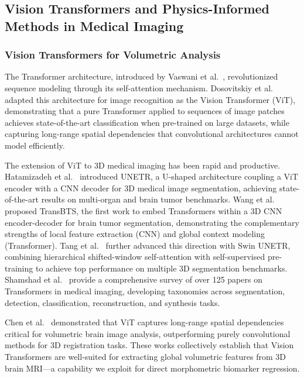 \subsection{Vision Transformers and Physics-Informed Methods in Medical Imaging}

\subsubsection{Vision Transformers for Volumetric Analysis}

The Transformer architecture, introduced by Vaswani et al.~\cite{vaswani2017attention}, revolutionized sequence modeling through its self-attention mechanism. Dosovitskiy et al.~\cite{dosovitskiy2021vit} adapted this architecture for image recognition as the Vision Transformer (ViT), demonstrating that a pure Transformer applied to sequences of image patches achieves state-of-the-art classification when pre-trained on large datasets, while capturing long-range spatial dependencies that convolutional architectures cannot model efficiently.

The extension of ViT to 3D medical imaging has been rapid and productive. Hatamizadeh et al.~\cite{hatamizadeh2022unetr} introduced UNETR, a U-shaped architecture coupling a ViT encoder with a CNN decoder for 3D medical image segmentation, achieving state-of-the-art results on multi-organ and brain tumor benchmarks. Wang et al.~\cite{wang2021transbts} proposed TransBTS, the first work to embed Transformers within a 3D CNN encoder-decoder for brain tumor segmentation, demonstrating the complementary strengths of local feature extraction (CNN) and global context modeling (Transformer). Tang et al.~\cite{tang2022swinunetr} further advanced this direction with Swin UNETR, combining hierarchical shifted-window self-attention with self-supervised pre-training to achieve top performance on multiple 3D segmentation benchmarks. Shamshad et al.~\cite{shamshad2023survey} provide a comprehensive survey of over 125 papers on Transformers in medical imaging, developing taxonomies across segmentation, detection, classification, reconstruction, and synthesis tasks.

Chen et al.~\cite{chen2021vitvnet} demonstrated that ViT captures long-range spatial dependencies critical for volumetric brain image analysis, outperforming purely convolutional methods for 3D registration tasks. These works collectively establish that Vision Transformers are well-suited for extracting global volumetric features from 3D brain MRI---a capability we exploit for direct morphometric biomarker regression.


